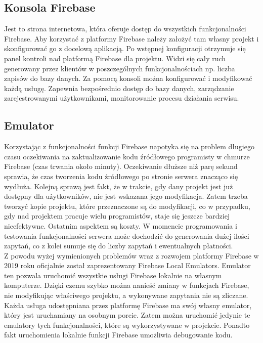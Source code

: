 \subsection{Konsola Firebase}

Jest to strona internetowa, która oferuje dostęp do wszystkich funkcjonalności Firebase. Aby korzystać z platformy Firebase należy założyć tam własny projekt i skonfigurować go z docelową aplikacją. Po wstępnej konfiguracji otrzymuje się panel kontroli nad platformą Firebase dla projektu. Widzi się cały ruch generowany przez klientów w poszczególnych funkcjonalnościach np. liczba zapisów do bazy danych. Za pomocą konsoli można konfigurować i modyfikować każdą usługę. Zapewnia bezpośrednio dostęp do bazy danych, zarządzanie zarejestrowanymi użytkownikami, monitorowanie procesu działania serwisu. 

\subsection{Emulator}

Korzystając z funkcjonalności funkcji Firebase napotyka się na problem długiego czasu oczekiwania na zaktualizowanie kodu źródłowego programisty w chmurze Firebase (czas trwania około minuty). Oczekiwanie dłuższe niż parę sekund sprawia, że czas tworzenia kodu źródłowego po stronie serwera znacząco się wydłuża. Kolejną sprawą jest fakt, że w trakcie, gdy dany projekt jest już dostępny dla użytkowników, nie jest wskazana jego modyfikacja. Zatem trzeba tworzyć kopie projektu, które przeznaczone są do modyfikacji, co w przypadku, gdy nad projektem pracuje wielu programistów, staje się jeszcze bardziej nieefektywne. Ostatnim aspektem są koszty. W momencie programowania i testowania funkcjonalności serwera może dochodzić do generowania dużej ilości zapytań, co z kolei sumuje się do liczby zapytań i ewentualnych płatności. \\

Z powodu wyżej wymienionych problemów wraz z rozwojem platformy Firebase w 2019 roku oficjalnie został zaprezentowany Firebase Local Emulators. Emulator ten pozwala uruchomić wszystkie usługi Firebase lokalnie na własnym komputerze. Dzięki czemu szybko można nanieść zmiany w funkcjach Firebase, nie modyfikując właściwego projektu, a wykonywane zapytania nie są zliczane. \\

Każda usługa udostępniana przez platformę Firebase ma swój własny emulator, który jest uruchamiany na osobnym porcie. Zatem można uruchomić jedynie te emulatory tych funkcjonalności, które są wykorzystywane w projekcie. Ponadto fakt uruchomienia lokalnie funkcji Firebase  umożliwia debugowanie kodu.



